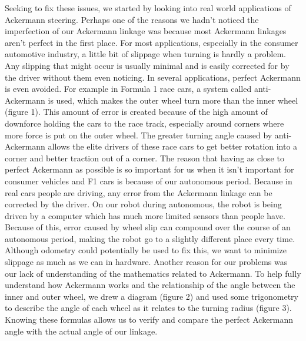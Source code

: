 Seeking to fix these issues, we started by looking into real world applications of Ackermann steering. Perhaps one of the reasons we hadn’t noticed the imperfection of our Ackermann linkage was because most Ackermann linkages aren’t perfect in the first place. For most applications, especially in the consumer automotive industry, a little bit of slippage when turning is hardly a problem. Any slipping that might occur is usually minimal and is easily corrected for by the driver without them even noticing. In several applications, perfect Ackermann is even avoided. For example in Formula 1 race cars, a system called anti-Ackermann is used, which makes the outer wheel turn more than the inner wheel (figure 1). This amount of error is created because of the high amount of downforce holding the cars to the race track, especially around corners where more force is put on the outer wheel. The greater turning angle caused by anti-Ackermann allows the elite drivers of these race cars to get better rotation into a corner and better traction out of a corner. The reason that having as close to perfect Ackermann as possible is so important for us when it isn’t important for consumer vehicles and F1 cars is because of our autonomous period. Because in real cars people are driving, any error from the Ackermann linkage can be corrected by the driver. On our robot during autonomous, the robot is being driven by a computer which has much more limited sensors than people have. Because of this, error caused by wheel slip can compound over the course of an autonomous period, making the robot go to a slightly different place every time. Although odometry could potentially be used to fix this, we want to minimize slippage as much as we can in hardware.
Another reason for our problems was our lack of understanding of the mathematics related to Ackermann. To help fully understand how Ackermann works and the relationship of the angle between the inner and outer wheel, we drew a diagram (figure 2) and used some trigonometry to describe the angle of each wheel as it relates to the turning radius (figure 3). Knowing these formulas allows us to verify and compare the perfect Ackermann angle with the actual angle of our linkage.

